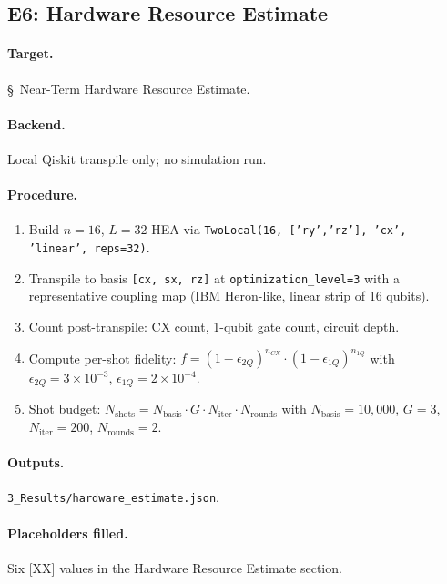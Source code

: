 \documentclass[11pt]{article}
\begin{document}
\subsection{E6: Hardware Resource Estimate}

\paragraph*{Target.} \S~Near-Term Hardware Resource Estimate.

\paragraph*{Backend.} Local Qiskit transpile only; no simulation run.

\paragraph*{Procedure.}
\begin{enumerate}[leftmargin=*]
  \item Build $n = 16$, $L = 32$ HEA via
        \texttt{TwoLocal(16, ['ry','rz'], 'cx', 'linear', reps=32)}.
  \item Transpile to basis \texttt{[cx, sx, rz]} at
        \texttt{optimization\_level=3} with a representative
        coupling map (IBM Heron-like, linear strip of 16 qubits).
  \item Count post-transpile: CX count, 1-qubit gate count, circuit
        depth.
  \item Compute per-shot fidelity:
        $f = (1 - \epsilon_{2Q})^{n_{CX}} \cdot
             (1 - \epsilon_{1Q})^{n_{1Q}}$
        with $\epsilon_{2Q} = 3\times 10^{-3}$,
        $\epsilon_{1Q} = 2\times 10^{-4}$.
  \item Shot budget: $N_{\text{shots}} = N_{\text{basis}} \cdot
        G \cdot N_{\text{iter}} \cdot N_{\text{rounds}}$ with
        $N_{\text{basis}} = 10{,}000$, $G = 3$, $N_{\text{iter}} =
        200$, $N_{\text{rounds}} = 2$.
\end{enumerate}

\paragraph*{Outputs.}
\texttt{3\_Results/hardware\_estimate.json}.

\paragraph*{Placeholders filled.} Six [XX] values in the Hardware
Resource Estimate section.
\end{document}
